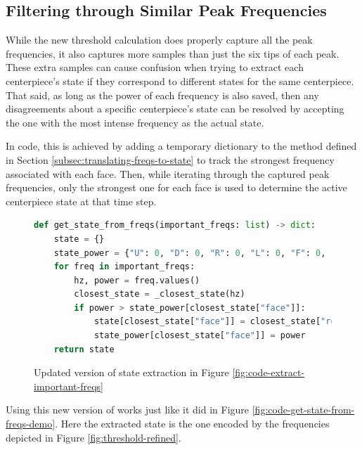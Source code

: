 \newpage
\subsection{Filtering through Similar Peak Frequencies}
\label{subsec:filtering-similar-peak-frequencies}

While the new threshold calculation does properly capture all the peak
frequencies, it also captures more samples than just the six tips of
each peak. These extra samples can cause confusion when trying to
extract each centerpiece's state if they correspond to different states
for the same centerpiece. That said, as long as the power of each
frequency is also saved, then any disagreements about a specific
centerpiece's state can be resolved by accepting the one with the most
intense frequency as the actual state.

In code, this is achieved by adding a temporary dictionary to the
 method defined in Section
\ref{subsec:translating-freqs-to-state} to track the strongest
frequency associated with each face. Then, while iterating through the
captured peak frequencies, only the strongest one for each face is used
to determine the active centerpiece state at that time step.

\begin{figure}[h]
\caption{Updated version of state extraction in Figure \ref{fig:code-extract-important-freqs}}
\label{fig:code-get-state-from-freqs-new}
\begin{lstlisting}[language=Python]
def get_state_from_freqs(important_freqs: list) -> dict:
    state = {}
    state_power = {"U": 0, "D": 0, "R": 0, "L": 0, "F": 0, "B": 0}  # New
    for freq in important_freqs:
        hz, power = freq.values()
        closest_state = _closest_state(hz)
        if power > state_power[closest_state["face"]]:              # New
            state[closest_state["face"]] = closest_state["rotation"]
            state_power[closest_state["face"]] = power              # New
    return state
\end{lstlisting}
\end{figure}

Using this new version of  works just like
it did in Figure \ref{fig:code-get-state-from-freqs-demo}. Here the
extracted state is the one encoded by the frequencies depicted in
Figure \ref{fig:threshold-refined}.

